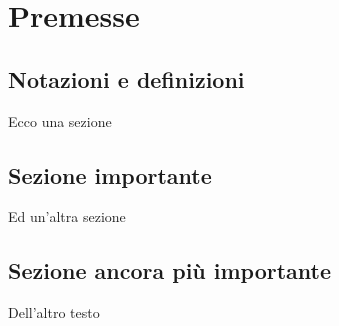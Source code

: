 \chapter{Premesse}
	\section{Notazioni e definizioni}
        Ecco una sezione

	\section{Sezione importante}
        Ed un'altra sezione

	\section{Sezione ancora più importante}
        Dell'altro testo

